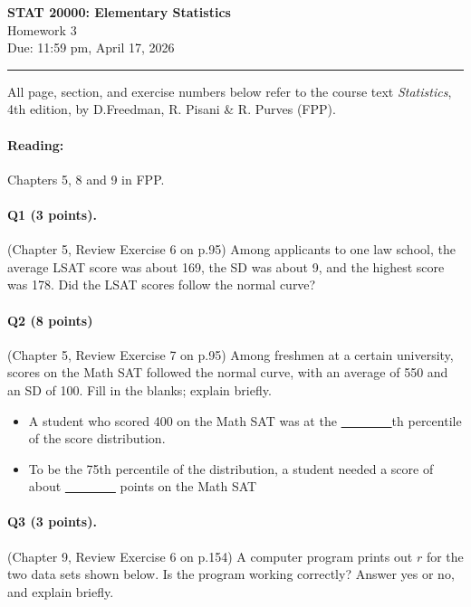 \documentclass[11pt]{article}
\newcommand{\course}{STAT 20000: Elementary Statistics}
\newcommand{\hwtitle}{Homework 3}
\newcommand{\duedate}{Due: 11:59 pm, April 17, 2026}
\begin{document}
\begin{center}
    {\Large \textbf{\course}}\\
    {\large \hwtitle}\\
    \duedate\\
    \vspace{0.5em}
\end{center}

\hrule
\vspace{1em}


\noindent All page, section, and exercise numbers below refer to the course text \textit{Statistics}, 4th edition, by D.Freedman, R. Pisani \& R. Purves (FPP).

\paragraph{Reading: }Chapters 5, 8 and 9 in FPP.

\paragraph{Q1 (3 points).} (Chapter 5, Review Exercise 6 on p.95)
Among applicants to one law school, the average LSAT score was about 169,
the SD was about 9, and the highest score was 178. Did the LSAT scores
follow the normal curve?

\paragraph{Q2 (8 points)} (Chapter 5, Review Exercise 7 on p.95) Among freshmen at a certain university, scores on the Math SAT followed the normal curve, with an average of 550 and an SD of 100. Fill in the blanks; explain briefly.

\begin{itemize}
    \item [(a)] A student who scored 400 on the Math SAT was at the \underline{~~~~~~~~}th percentile of the score distribution.
    \item [(b)] To be the 75th percentile of the distribution, a student needed a score of about \underline{~~~~~~~~} points on the Math SAT
\end{itemize}


\paragraph{Q3 (3 points).} (Chapter 9, Review Exercise 6 on p.154) A computer program prints out $r$ for the two data sets shown below. Is the program working correctly? Answer yes or no, and explain briefly.
\end{document}
